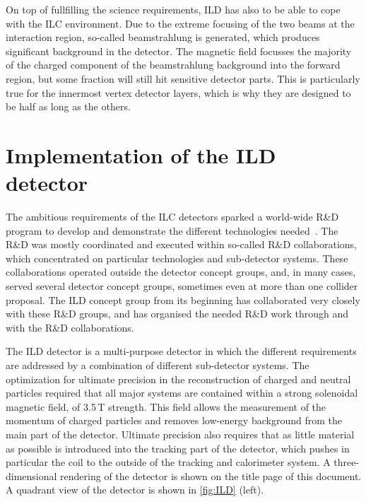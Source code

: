\documentclass[%
 amsmath,amssymb,
 aps,
 longbibliography,
]{revtex4-1}
\begin{document}
On top of fullfilling the science requirements, ILD has also to be able to cope with the ILC environment. Due to the extreme focusing of the two beams at the interaction region, so-called beamstrahlung is generated, which produces significant background in the detector. The magnetic field focusses the majority of the charged component of the beamstrahlung background into the forward region, but some fraction will still hit sensitive detector parts. This is particularly true for the innermost vertex detector layers, which is why they are designed to be half as long as the others.



\section{Implementation of the ILD detector}
The ambitious requirements of the ILC detectors sparked a world-wide R\&D program to develop and demonstrate the different technologies needed~\cite{RDliaision}. The R\&D was mostly coordinated and executed within so-called R\&D collaborations, which concentrated on particular technologies and sub-detector systems. These collaborations operated outside the detector concept groups, and, in many cases, served several detector concept groups, sometimes even at more than one collider proposal. The ILD concept group from its beginning has collaborated very closely with these R\&D groups, and has organised the needed R\&D work through and with the R\&D collaborations. 

The ILD detector is a multi-purpose detector in which the different requirements are addressed by a combination of different sub-detector systems. The optimization for ultimate precision in the reconstruction of charged and neutral particles required that all major systems are contained within a strong solenoidal magnetic field, of 3.5\,T strength. This field allows the measurement of the momentum of charged particles and removes low-energy background from the main part of the detector. Ultimate precision also requires that as little material as possible is introduced into the tracking part of the detector, which pushes in particular the coil to the outside of the tracking and calorimeter system. A three-dimensional rendering of the detector is shown on the title page of this document.
A quadrant view of the detector is shown in \ref{fig:ILD} (left).
\end{document}

